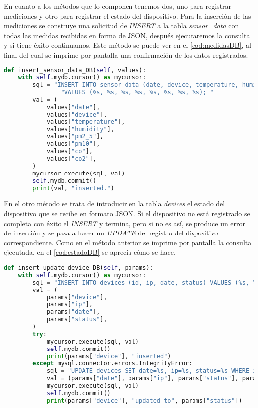En cuanto a los métodos que lo componen tenemos dos, uno para registrar mediciones y otro para registrar el estado del dispositivo. Para la inserción de las mediciones se construye una solicitud de \textit{INSERT} a la tabla \textit{sensor\_data} con todas las medidas recibidas en forma de JSON, después ejecutaremos la consulta y si tiene éxito continuamos. Este método se puede ver en el \autoref{cod:medidasDB}, al final del cual se imprime por pantalla una confirmación de los datos registrados.
\begin{lstlisting}[language=Python, label=cod:medidasDB, caption=Inserción de mediciones en la base de datos]
def insert_sensor_data_DB(self, values):
    with self.mydb.cursor() as mycursor:
        sql = "INSERT INTO sensor_data (date, device, temperature, humidity, pm2_5, pm10, co, co2)" \
                "VALUES (%s, %s, %s, %s, %s, %s, %s, %s); "
        val = (
            values["date"],
            values["device"],
            values["temperature"],
            values["humidity"],
            values["pm2_5"],
            values["pm10"],
            values["co"],
            values["co2"],
        )
        mycursor.execute(sql, val)
        self.mydb.commit()
        print(val, "inserted.")
\end{lstlisting}

En el otro método se trata de introducir en la tabla \textit{devices} el estado del dispositivo que se recibe en formato JSON. Si el dispositivo no está registrado se completa con éxito el \textit{INSERT} y termina, pero si no es así, se produce un error de inserción y se pasa a hacer un \textit{UPDATE} del registro del dispositivo correspondiente. Como en el método anterior se imprime por pantalla la consulta ejecutada, en el \autoref{cod:estadoDB} se aprecia cómo se hace.
\begin{lstlisting}[language=Python, label=cod:estadoDB, caption=Inserción de estado del dispositivo en la base de datos]
def insert_update_device_DB(self, params):
    with self.mydb.cursor() as mycursor:
        sql = "INSERT INTO devices (id, ip, date, status) VALUES (%s, %s, %s, %s)"
        val = (
            params["device"],
            params["ip"],
            params["date"],
            params["status"],
        )
        try:
            mycursor.execute(sql, val)
            self.mydb.commit()
            print(params["device"], "inserted")
        except mysql.connector.errors.IntegrityError:
            sql = "UPDATE devices SET date=%s, ip=%s, status=%s WHERE id=%s"
            val = (params["date"], params["ip"], params["status"], params["device"])
            mycursor.execute(sql, val)
            self.mydb.commit()
            print(params["device"], "updated to", params["status"])
\end{lstlisting}

